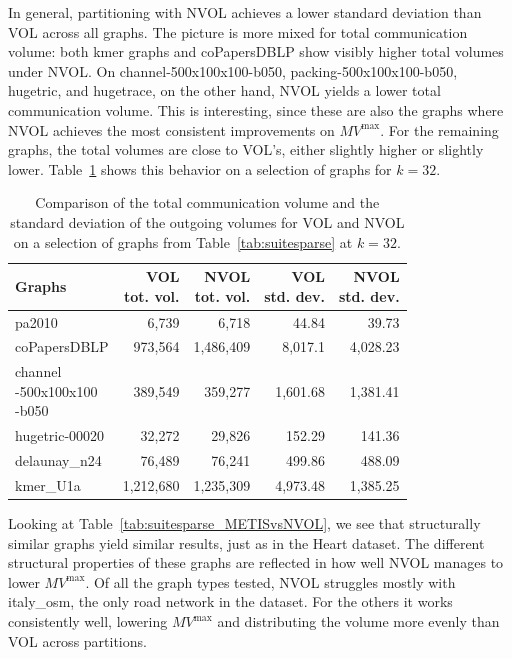 In general, partitioning with NVOL achieves a lower standard deviation than VOL across all graphs. The picture is more mixed for total communication volume: both kmer graphs and coPapersDBLP show visibly higher total volumes under NVOL. On channel-500x100x100-b050, packing-500x100x100-b050, hugetric, and hugetrace, on the other hand, NVOL yields a lower total communication volume. This is interesting, since these are also the graphs where NVOL achieves the most consistent improvements on $MV^{\mathrm{max}}$. For the remaining graphs, the total volumes are close to VOL's, either slightly higher or slightly lower. Table~\ref{tab:suitesparse_32pcompareTotvol} shows this behavior on a selection of graphs for $k=32$.

\begin{table}[h]
	\centering
	\begin{tabular}{|l|r|r|r|r|}
		\hline
		\textbf{Graphs}
		& \makecell{\textbf{VOL}\\\textbf{tot. vol.}}
		& \makecell{\textbf{NVOL}\\\textbf{tot. vol.}}
		& \makecell{\textbf{VOL}\\\textbf{std. dev.}}
		& \makecell{\textbf{NVOL}\\\textbf{std. dev.}}\\
		\hline
		pa2010 & 6,739 & 6,718 & 44.84 & 39.73\\
		\hline
		coPapersDBLP & 973,564 & 1,486,409 & 8,017.1 & 4,028.23\\
		\hline
		\makecell[l]{channel\\-500x100x100\\-b050} & 389,549 & 359,277 & 1,601.68 & 1,381.41\\
		\hline
		hugetric-00020 & 32,272 & 29,826 & 152.29 & 141.36\\
		\hline
		delaunay\_n24 & 76,489 & 76,241 & 499.86 & 488.09\\
		\hline
		kmer\_U1a & 1,212,680 & 1,235,309 & 4,973.48 & 1,385.25\\
		\hline
	\end{tabular}
	\caption{Comparison of the total communication volume and the standard deviation of the outgoing volumes for VOL and NVOL on a selection of graphs from Table~\ref{tab:suitesparse} at $k=32$.}
	\label{tab:suitesparse_32pcompareTotvol}
\end{table}

Looking at Table~\ref{tab:suitesparse_METISvsNVOL}, we see that structurally similar graphs yield similar results, just as in the Heart dataset. The different structural properties of these graphs are reflected in how well NVOL manages to lower $MV^{\mathrm{max}}$. Of all the graph types tested, NVOL struggles mostly with italy\_osm, the only road network in the dataset. For the others it works consistently well, lowering $MV^{\mathrm{max}}$ and distributing the volume more evenly than VOL across partitions.


